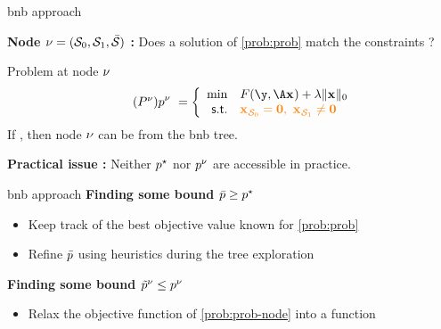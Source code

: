 \documentclass[10pt]{beamer}
\begin{document}
\begin{frame}{\gls{bnb} approach}

  \textbf{Node $\nu=(\mathcal{S}_0,\mathcal{S}_1,\bar{\mathcal{S}})$ :} Does a solution of \eqref{prob:prob} match the constraints ? 

  \pause
  \vspace{0.2cm}

  \begin{block}{Problem at node $\nu$}
    \begin{equation}
      \label{prob:prob-node} \tag{\(\node{\ppb}\)}
      \node{\pobj} \ =
      \left\{
      \begin{array}{rl}
        \min & \datafunc(\obs,\dic\pv) + \reg \norm{\pv}{0} \\
        \st & \emphone{\subzero{\pv} = \0, \ \subone{\pv} \neq \0}
      \end{array}
      \right.
    \end{equation}
    If \emphone{$\opt{\pobj} < \node{\pobj}$}, then node $\nu$ can be  from the \gls{bnb} tree.
  \end{block}

  \vspace*{1cm}
  \pause
  \textbf{Practical issue :}
  Neither $p^{\star}$ nor $p^{\nu}$ are accessible in practice.
  \pause
  \begin{center}
    
  \end{center}
\end{frame}

\begin{frame}{\gls{bnb} approach}
  \textbf{Finding some  bound $\bar{p} \geq p^{\star}$}
  \begin{itemize}
    \item Keep track of the best objective value known for \eqref{prob:prob}
    \item Refine $\bar{p}$ using heuristics during the tree exploration
  \end{itemize}
  \vspace*{0.5cm}
  \pause
  \textbf{Finding some  bound $\tilde{p}^{\nu} \leq p^{\nu}$}
  \begin{itemize}
    \item Relax the objective function of \eqref{prob:prob-node} into a  function
  \end{itemize}
\end{frame}
\end{document}
